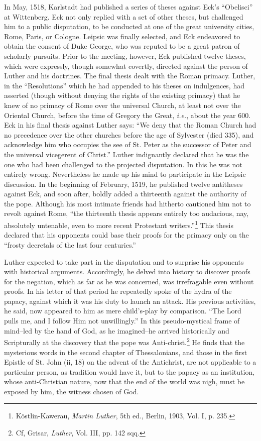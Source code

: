 In May, 1518, Karlstadt had published a series of theses against
Eck’s “Obelisci” at Wittenberg. Eck not only replied with a set of
other theses, but challenged him to a public disputation, to be conducted
at one of the great university cities, Rome, Paris, or Cologne.
Leipsic was finally selected, and Eck endeavored to obtain the consent
of Duke George, who was reputed to be a great patron of scholarly
pursuits. Prior to the meeting, however, Eck published twelve
theses, which were expressly, though somewhat covertly, directed
against the person of Luther and his doctrines. The final thesis dealt
with the Roman primacy. Luther, in the “Resolutions” which he had
appended to his theses on indulgences, had asserted (though without
denying the rights of the existing primacy) that he knew of no primacy
of Rome over the universal Church, at least not over the Oriental Church,
before the time of Gregory the Great, \textit{i.e.}, about the
year 600. Eck in his final thesis against Luther says: “We deny that
the Roman Church had no precedence over the other churches before
the age of Sylvester (died 335), and acknowledge him who occupies
the see of St. Peter as the successor of Peter and the universal vicegerent
of Christ.” Luther indignantly declared that he was the one
who had been challenged to the projected disputation. In this he was
not entirely wrong. Nevertheless he made up his mind to participate
in the Leipsic discussion. In the beginning of February, 1519, he
published twelve antitheses against Eck, and soon after, boldly added
a thirteenth against the authority of the pope. Although his most intimate
friends had hitherto cautioned him not to revolt against Rome,
“the thirteenth thesis appears entirely too audacious, nay, absolutely
untenable, even to more recent Protestant writers.”\footnote
{Köstlin-Kawerau, \textit{Martin Luther}, 5th ed., Berlin, 1903, Vol. I, p. 235.}
This thesis
declared that his opponents could base their proofs for the primacy only
on the “frosty decretals of the last four centuries.”

Luther expected to take part in the disputation and to surprise his
opponents with historical arguments. Accordingly, he delved into
history to discover proofs for the negation, which as far as he was
concerned, was irrefragable even without proofs. In his letter of that
period he repeatedly spoke of the hydra of the papacy, against which
it was his duty to launch an attack. His previous activities, he said,
now appeared to him as mere child's-play by comparison. ``The Lord
pulls me, and I follow Him not unwillingly.'' In this pseudo-mystical
frame of mind--led by the hand of God, as he imagined--he arrived
historically and Scripturally at the discovery that the pope was Anti-christ.\footnote
{Cf, Grisar, \textit{Luther}, Vol. III, pp. 142 sqq.}
He finds that the mysterious words in the second chapter of
Thessalonians, and those in the first Epistle of St. John (ii, 18) on the
advent of the Antichrist, are not applicable to a particular person, as
tradition would have it, but to the papacy as an institution, whose anti-Christian
nature, now that the end of the world was nigh, must be
exposed by him, the witness chosen of God.

